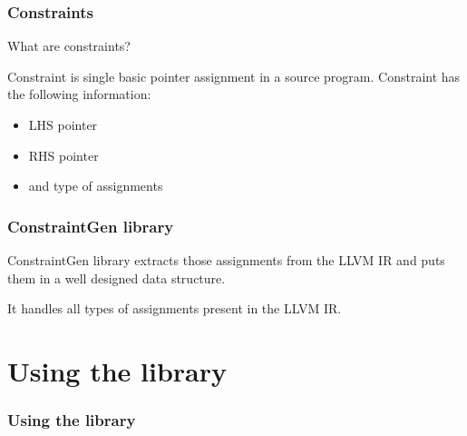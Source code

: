 \documentclass{beamer}
\begin{document}
\begin{frame}
\frametitle{Constraints}
\vspace{15pt}
\huge What are constraints?

\vspace{15pt}
\normalsize
Constraint is single basic pointer assignment in a source program.
Constraint has the following information:
\begin{itemize}
	\item<2-> LHS pointer
	\item<3-> RHS pointer
	\item<4-> and type of assignments
\end{itemize}
\end{frame}

\begin{frame}
\frametitle{ConstraintGen library}
ConstraintGen library extracts those assignments from the LLVM IR and puts
them in a well designed data structure.

\vspace{15pt}
\pause
It handles all types of assignments present in the LLVM IR.

\end{frame}

\section{Using the library}
\begin{frame}
\frametitle{Using the library}
\end{frame}
\end{document}
